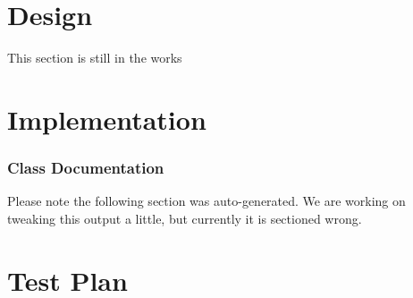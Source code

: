 \documentclass{report}
\begin{document}
\chapter{Design}
This section is still in the works

\chapter{Implementation}

    \subsection{Class Documentation}

Please note the following section was auto-generated. We are
working on tweaking this output a little, but currently it is
sectioned wrong.

%
%
%
%
%
%
%
%
%
%

\chapter{Test Plan}
\end{document}
